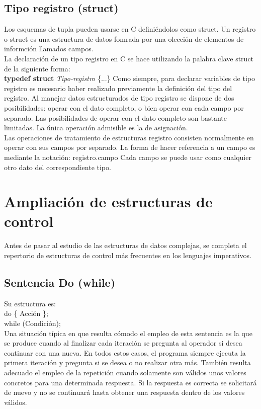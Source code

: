 \documentclass[11pt,a4paper]{article}
\begin{document}
  \subsection{Tipo registro (struct)}
  Los esquemas de tupla pueden usarse en C definiéndolos como struct. Un registro o struct es una estructura de datos fomrada por una olección de elementos de informción llamados campos.
  \\
  La declaración de un tipo registro en C se hace utilizando la palabra clave struct de la siguiente forma:\\
  \textbf{typedef struct} \textit{Tipo-registro} \{...\}
  Como siempre, para declarar variables de tipo registro es necesario haber
  realizado previamente la definición del tipo del registro. Al manejar datos estructurados de tipo registro se dispone de dos posibilidades:
  operar con el dato completo, o bien operar con cada campo por separado. Las
  posibilidades de operar con el dato completo son bastante limitadas. La única
  operación admisible es la de asignación. \\
  Las operaciones de tratamiento de estructuras registro consisten normalmente
  en operar con sus campos por separado. La forma de hacer referencia a un
  campo es mediante la notación: registro.campo  Cada campo se puede usar como cualquier otro dato del correspondiente tipo.
  \section{Ampliación de estructuras de control}
  Antes de pasar al estudio de las estructuras de datos complejas, se completa el repertorio de estructuras de control más frecuentes en los lenguajes imperativos.
  \subsection{Sentencia Do (while)}
  Su estructura es:\\ do \{ Acción \}; \\ while (Condición);\\
  Una situación típica en que resulta cómodo el empleo de esta sentencia es la
  que se produce cuando al finalizar cada iteración se pregunta al operador si
  desea continuar con una nueva. En todos estos casos, el programa siempre
  ejecuta la primera iteración y pregunta si se desea o no realizar otra más. También resulta adecuado el empleo de la repetición cuando solamente son válidos unos
  valores concretos para una determinada respuesta. Si la respuesta
  es correcta se solicitará de nuevo y no se continuará hasta obtener una respuesta dentro de los valores válidos.\\
  
\end{document}
